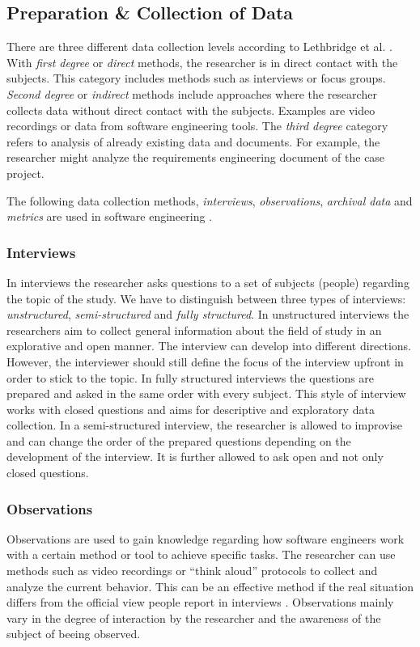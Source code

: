 \documentclass[runningheads]{llncs}
\begin{document}
\subsection{Preparation \& Collection of Data}\label{preparation-and-collection-of-data}
There are three different data collection levels according to Lethbridge et al. \cite{Lethbridge2005}. With \textit{first degree} or \textit{direct} methods, the researcher is in direct contact with the subjects. This category includes methods such as interviews or focus groups. \textit{Second degree} or \textit{indirect} methods include approaches where the researcher collects data without direct contact with the subjects. Examples are video recordings or data from software engineering tools. The \textit{third degree} category refers to analysis of already existing data and documents. For example, the researcher might analyze the requirements engineering document of the case project.

The following data collection methods, \textit{interviews}, \textit{observations}, \textit{archival data} and \textit{metrics} are used in software engineering \cite{Benbasat:1987:CRS:35194.35201,Runeson:2012:CSR:2361717,yin2009case}.

\subsubsection{Interviews}
In interviews the researcher asks questions to a set of subjects (people) regarding the topic of the study. We have to distinguish between three types of interviews: \textit{unstructured}, \textit{semi-structured} and \textit{fully structured}. In unstructured interviews the researchers aim to collect general information about the field of study in an explorative and open manner. The interview can develop into different directions. However, the interviewer should still define the focus of the interview upfront in order to stick to the topic. In fully structured interviews the questions are prepared and asked in the same order with every subject. This style of interview works with closed questions and aims for descriptive and exploratory data collection. In a semi-structured interview, the researcher is allowed to improvise and can change the order of the prepared questions depending on the development of the interview. It is further allowed to ask open and not only closed questions.

\subsubsection{Observations}
Observations are used to gain knowledge regarding how software engineers work with a certain method or tool to achieve specific tasks. The researcher can use methods such as video recordings or ``think aloud'' protocols \cite{Wohlin:2012:ESE:2349018} to collect and analyze the current behavior. This can be an effective method if the real situation differs from the official view people report in interviews \cite{Runeson:2012:CSR:2361717}. Observations mainly vary in the degree of interaction by the researcher and the awareness of the subject of beeing observed.
\end{document}
